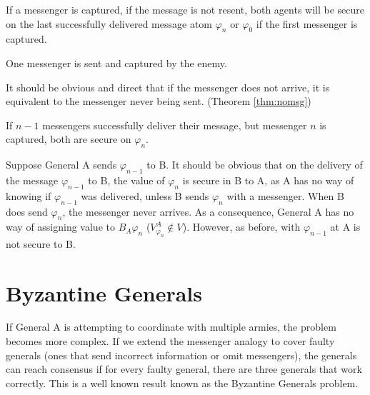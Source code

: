 \begin{thm}
If a messenger is captured, if the message is not resent, both agents will be secure on the last successfully delivered message atom $\varphi_{n}$ or $\varphi_0$ if the first messenger is captured.
\label{thm:captured}
\end{thm}

\begin{case}
One messenger is sent and captured by the enemy.
\end{case}

It should be obvious and direct that if the messenger does not arrive, it is equivalent to the messenger never being sent. (Theorem \ref{thm:nomsg})

\begin{case}
If $n-1$ messengers successfully deliver their message, but messenger $n$ is captured, both are secure on $\varphi_{n}$.
\end{case}

Suppose General A sends $\varphi_{n-1}$ to B. It should be obvious that on the delivery of the message $\varphi_{n-1}$ to B, the value of $\varphi_{n}$ is secure in B to A, as A has no way of knowing if $\varphi_{n-1}$ was delivered, unless B sends $\varphi_{n}$ with a messenger. When B does send $\varphi_{n}$, the messenger never arrives. As a consequence, General A has no way of assigning value to $B_A \varphi_n$ ($V_{\varphi_n}^A \not \in V$). However, as before, with $\varphi_{n-1}$ at A is not secure to B.



\section{Byzantine Generals}

If General A is attempting to coordinate with multiple armies, the problem becomes more complex. If we extend the messenger analogy to cover faulty generals (ones that send incorrect information or omit messengers), the generals can reach consensus if for every faulty general, there are three generals that work correctly. This is a well known result known as the Byzantine Generals problem.

